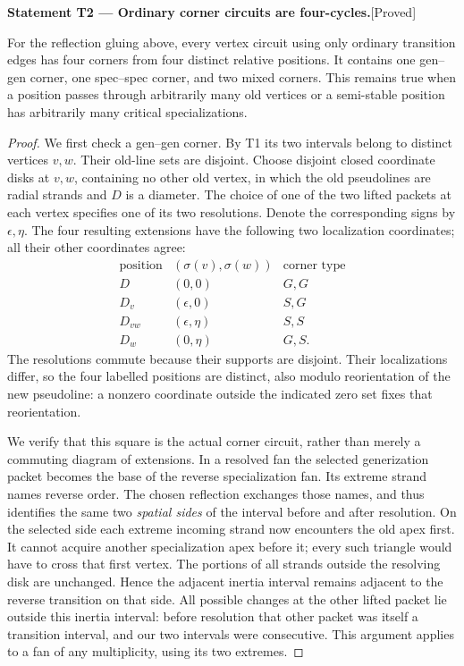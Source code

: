 \documentclass[11pt,a4paper]{article}
\newenvironment{resultenv}[3]{\par\medskip\phantomsection\label{#1}\noindent\textbf{Statement #1 --- #3.}\quad\textsf{[#2]}\par\smallskip\noindent\ignorespaces}{\par\medskip}
\begin{document}
\begin{resultenv}{T2}{Proved}{Ordinary corner circuits are four-cycles}
For the reflection gluing above, every vertex circuit using only
ordinary transition edges has four corners from four distinct relative
positions. It contains one gen--gen corner, one spec--spec corner, and
two mixed corners. This remains true when a position passes through
arbitrarily many old vertices or a semi-stable position has arbitrarily
many critical specializations.
\end{resultenv}
\begin{proof}
We first check a gen--gen corner. By T1 its two intervals belong to
distinct vertices $v,w$. Their old-line sets are disjoint. Choose
disjoint closed coordinate disks at $v,w$, containing no other old
vertex, in which the old pseudolines are radial strands and $D$ is a
diameter. The choice of one of the two lifted packets at each vertex
specifies one of its two resolutions. Denote the corresponding signs
by $\epsilon,\eta$. The four resulting extensions have the following
two localization coordinates; all their other coordinates agree:
\[
\begin{array}{c|c|c}
\text{position}&(\sigma(v),\sigma(w))&\text{corner type}\\\hline
D&(0,0)&G,G\\
D_v&(\epsilon,0)&S,G\\
D_{vw}&(\epsilon,\eta)&S,S\\
D_w&(0,\eta)&G,S.
\end{array}
\]
The resolutions commute because their supports are disjoint. Their
localizations differ, so the four labelled positions are distinct,
also modulo reorientation of the new pseudoline: a nonzero coordinate
outside the indicated zero set fixes that reorientation.

We verify that this square is the actual corner circuit, rather than
merely a commuting diagram of extensions. In a resolved fan the selected
generization packet becomes the base of the reverse specialization
fan. Its extreme strand names reverse order. The chosen reflection
exchanges those names, and thus identifies the same two \emph{spatial
sides} of the interval before and after resolution. On the selected
side each extreme incoming strand now encounters the old apex first.
It cannot acquire another specialization apex before it; every such
triangle would have to cross that first vertex. The portions of all
strands outside the resolving disk are unchanged. Hence the adjacent
inertia interval remains adjacent to the reverse transition on that
side. All possible changes at the other lifted packet lie outside
this inertia interval: before resolution that other packet was itself
a transition interval, and our two intervals were consecutive. This
argument applies to a fan of any multiplicity, using its two extremes.


\end{proof}
\end{document}
